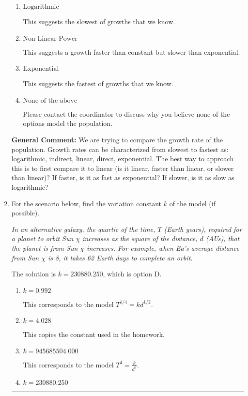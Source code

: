 \documentclass{extbook}[14pt]
\newcommand{\litem}[1]{\item #1

\rule{\textwidth}{0.4pt}}
\begin{document}
\begin{enumerate}
{\begin{enumerate}[label=\Alph*.]
This suggests a constant growth. You would be able to add or subtract the same amount year-to-year if this is the correct answer.
\item \( \text{Logarithmic} \)

This suggests the slowest of growths that we know.
\item \( \text{Non-Linear Power} \)

This suggests a growth faster than constant but slower than exponential.
\item \( \text{Exponential} \)

This suggests the fastest of growths that we know.
\item \( \text{None of the above} \)

Please contact the coordinator to discuss why you believe none of the options model the population.
\end{enumerate}

\textbf{General Comment:} We are trying to compare the growth rate of the population. Growth rates can be characterized from slowest to fastest as: logarithmic, indirect, linear, direct, exponential. The best way to approach this is to first compare it to linear (is it linear, faster than linear, or slower than linear)? If faster, is it as fast as exponential? If slower, is it as slow as logarithmic?
}
\litem{
For the scenario below, find the variation constant $k$ of the model (if possible).

\begin{center}
    \textit{ In an alternative galaxy, the quartic of the time, $T$ (Earth years), required for a planet to orbit Sun $\chi$ increases as the square of the distance, $d$ (AUs), that the planet is from Sun $\chi$ increases. For example, when Ea's average distance from Sun $\chi$ is 8, it takes 62 Earth days to complete an orbit. }
\end{center}
The solution is \( k = 230880.250 \), which is option D.\begin{enumerate}[label=\Alph*.]
\item \( k = 0.992 \)

This corresponds to the model $T^{1/4} = k d^{1/2}$.
\item \( k = 4.028 \)

This copies the constant used in the homework.
\item \( k = 945685504.000 \)

This corresponds to the model $T^{4} = \frac{k}{d^{2}}$.
\item \( k = 230880.250 \)


\end{enumerate}}
\end{enumerate}
\end{document}
